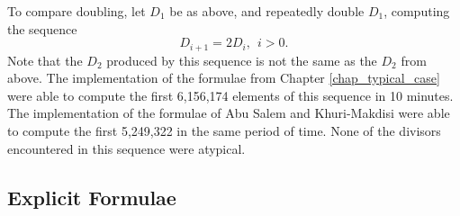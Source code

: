 To compare doubling, let $D_1$ be as above,
and repeatedly double $D_1$, computing the sequence
  \[ D_{i+1} = 2D_i, ~~ i > 0. \]
Note that the $D_2$ produced by this sequence is not the same as the $D_2$ from above.
The implementation of the formulae from Chapter \ref{chap_typical_case} were able to compute
the first 6,156,174 elements of this sequence in 10 minutes.
The implementation of the formulae of Abu Salem and Khuri-Makdisi were able to compute
the first 5,249,322 in the same period of time.
None of the divisors encountered in this sequence were atypical.



\pagebreak
\subsection{Explicit Formulae}
\label{sec_explicit_formulae}

